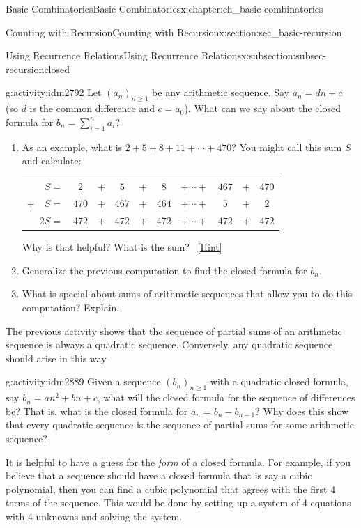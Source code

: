 \documentclass[oneside,10pt,]{book}
\numberwithin{equation}{chapter}
\newcommand{\hrulethin}  {\noalign{\hrule height 0.04em}}
\begin{document}
\begin{chapterptx}{Basic Combinatorics}{}{Basic Combinatorics}{}{}{x:chapter:ch_basic-combinatorics}
\begin{sectionptx}{Counting with Recursion}{}{Counting with Recursion}{}{}{x:section:sec_basic-recursion}
\begin{subsectionptx}{Using Recurrence Relations}{}{Using Recurrence Relations}{}{}{x:subsection:subsec-recursionclosed}
\begin{activity}{}{g:activity:idm2792}%
Let \((a_n)_{n \ge 1}\) be any arithmetic sequence.  Say \(a_n = dn + c\) (so \(d\) is the common difference and \(c = a_0\)).  What can we say about the closed formula for \(b_n = \sum_{i=1}^n a_i\)?%
\begin{enumerate}[font=\bfseries,label=(\alph*),ref=\alph*]
\item{}As an example, what is \(2+5+8+11+\cdots + 470\)?  You might call this sum \(S\) and calculate:%
\begin{sidebyside}{1}{0}{0}{0}%
\begin{sbspanel}{1}%
{\centering%
\begin{tabular}{rccccccccc}
\(S  =\)&\(2\)&\(+\)&\(5\)&\(+\)&\(8\)&\(+ \cdots +\)&\(467\)&\(+\)&470\tabularnewline[0pt]
\(+ \quad S  =\)&\(470\)&\(+\)&\(467\)&\(+\)&\(464\)&\(+ \cdots +\)&\(5\)&\(+\)&2\tabularnewline\hrulethin
\(2S  =\)&\(472\)&\(+\)&\(472\)&\(+\)&\(472\)&\(+ \cdots +\)&\(472\)&\(+\)&\(472\)
\end{tabular}
\par}
\end{sbspanel}%
\end{sidebyside}%
\par
Why is that helpful?  What is the sum?%
\qquad~\hfill{\tiny\hyperlink{g:hint:idm2879-back}{[Hint]}}\item{}Generalize the previous computation to find the closed formula for \(b_n\).%
\item{}What is special about sums of arithmetic sequences that allow you to do this computation?  Explain.%
\end{enumerate}
\end{activity}
The previous activity shows that the sequence of partial sums of an arithmetic sequence is always a quadratic sequence.  Conversely, any quadratic sequence should arise in this way.%
\begin{activity}{}{g:activity:idm2889}%
Given a sequence \((b_n)_{n \ge 1}\) with a quadratic closed formula, say \(b_n = an^2 + bn + c\), what will the closed formula for the sequence of differences be?  That is, what is the closed formula for \(a_n = b_n - b_{n-1}\)?  Why does this show that every quadratic sequence is the sequence of partial sums for some arithmetic sequence?%
\end{activity}
It is helpful to have a guess for the \emph{form} of a closed formula.  For example, if you believe that a sequence should have a closed formula that is say a cubic polynomial, then you can find a cubic polynomial that agrees with the first 4 terms of the sequence.  This would be done by setting up a system of 4 equations with 4 unknowns and solving the system.%

\end{subsectionptx}
\end{sectionptx}
\end{chapterptx}
\end{document}
